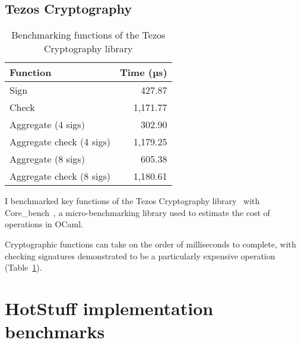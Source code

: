 \subsection{Tezos Cryptography} \label{tezosbenchmark}

\begin{table}[h]
	\centering
	\begin{tabular}{|l|r|}
	\hline
	Function                 & Time (µs) \\ \hline
	Sign                     & 427.87   \\
	Check                    & 1,171.77 \\
	Aggregate (4 sigs)       & 302.90   \\
	Aggregate check (4 sigs) & 1,179.25 \\
	Aggregate (8 sigs)       & 605.38   \\
	Aggregate check (8 sigs) & 1,180.61 \\ \hline
	\end{tabular}
	\caption{Benchmarking functions of the Tezos Cryptography library}
	\label{tezostable}
\end{table}

I benchmarked key functions of the Tezos Cryptography library~\cite{tezosCrypto} with Core\_bench~\cite{janestreetCoreBench2023}, a micro-benchmarking library used to estimate the cost of operations in OCaml.

Cryptographic functions can take on the order of milliseconds to complete, with checking signatures demonstrated to be a particularly expensive operation (Table~\ref{tezostable}).


\section{HotStuff implementation benchmarks} \label{hotstuffbenchmarks}


